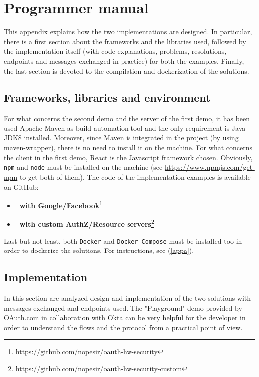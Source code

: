 
\chapter{Programmer manual}
This appendix explains how the two implementations are designed. In particular, there is a first section about the frameworks and the libraries used, followed by the implementation itself (with code explanations, problems, resolutions, endpoints and messages exchanged in practice) for both the examples. Finally, the last section is devoted to the compilation and dockerization of the solutions.

\minitoc

\section{Frameworks, libraries and environment}
For what concerns the second demo and the server of the first demo, it has been used Apache Maven as build automation tool and the only requirement is Java JDK8 installed. Moreover, since Maven is integrated in the project (by using maven-wrapper), there is no need to install it on the machine.
For what concerns the client in the first demo, React is the Javascript framework chosen. Obviously, \texttt{npm} and \texttt{node} must be installed on the machine (see \url{https://www.npmjs.com/get-npm} to get both of them). 
The code of the implementation examples is available on GitHub:

\begin{itemize}
    \item \textbf{\oauth\ with Google/Facebook}\footnote{\url{https://github.com/nopesir/oauth-hw-security}}
    \item \textbf{\oauth\ with custom AuthZ/Resource servers}\footnote{\url{https://github.com/nopesir/oauth-hw-security-custom}}
\end{itemize}

Last but not least, both \texttt{Docker} and \texttt{Docker-Compose} must be installed too in order to dockerize the solutions. For instructions, see (\ref{appa}).

\section{Implementation}
In this section are analyzed design and implementation of the two solutions with messages exchanged and endpoints used. The "Playground" demo provided by OAuth.com in collaboration with Okta \cite{playgr} can be very helpful for the developer in order to understand the flows and the protocol from a practical point of view. 


